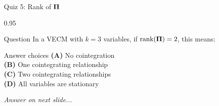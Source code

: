 \documentclass[9pt, aspectratio=169, t]{beamer}
\begin{document}
\begin{frame}{Quiz 5: Rank of $\boldsymbol{\Pi}$}
    \begin{cminipage}{0.95\textwidth}
    \begin{alertblock}{Question}
        In a VECM with $k=3$ variables, if $\text{rank}(\boldsymbol{\Pi}) = 2$, this means:
    \end{alertblock}

    \vspace{0.4cm}

    \begin{block}{Answer choices}
        \textcolor{MainBlue}{\textbf{(A)}} No cointegration\\[3pt]
        \textcolor{MainBlue}{\textbf{(B)}} One cointegrating relationship\\[3pt]
        \textcolor{MainBlue}{\textbf{(C)}} Two cointegrating relationships\\[3pt]
        \textcolor{MainBlue}{\textbf{(D)}} All variables are stationary
    \end{block}

    \vspace{0.5cm}

    \begin{center}
        \textit{Answer on next slide...}
    \end{center}
    \end{cminipage}
\end{frame}
\end{document}

